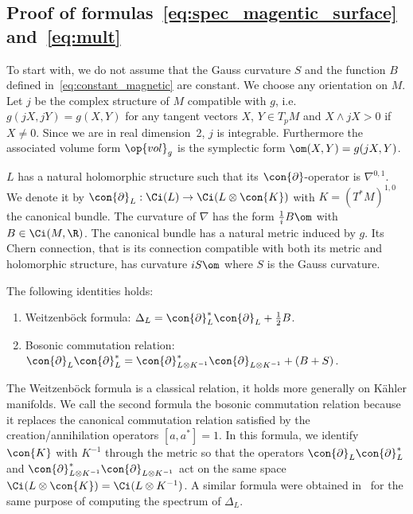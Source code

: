 \subsection*{Proof of formulas~\eqref{eq:spec_magentic_surface} and~\eqref{eq:mult}}

To start with, we do not assume that the Gauss curvature $S$ and the function $B$ defined in~\eqref{eq:constant_magnetic} are constant. We choose any orientation on $M$. Let $j$ be the complex structure of $M$ compatible with $g$, i.e. $g(jX, jY) = g(X,Y)$ for any tangent vectors $X$, $Y \in T_pM$ and $ X
\wedge jX >0$ if $X \neq 0$. Since we are in real dimension~2, $j$ is integrable. Furthermore the associated volume form $\op{vol}_g$ is the symplectic form $\om (X, Y) = g(jX, Y)$.

$L$ has a natural holomorphic structure such that its $\con{\partial}$-operator is $\nabla^{0,1}$. We denote it by $\con{\partial}_L: \Ci (L) \rightarrow \Ci (L \otimes \con{K})$ with $K = (T^*M)^{1,0}$ the canonical bundle. The curvature of $\nabla$ has the form $\frac{1}{i} B \om$ with $B \in \Ci (M, \R)$. The canonical bundle has a natural metric induced by $g$. Its Chern connection, that is its connection compatible with both its metric and holomorphic structure, has curvature $i S \om$ where $S$ is the Gauss curvature.

\begin{theo}\label{theo:appendix}
The following identities holds:
\begin{enumerate}
\item\label{theo7.1.1} Weitzenb\"ock formula: $\Delta_L = \con{\partial}^*_L \con{\partial}_L + \frac{1}{2} B$.
\item\label{theo7.1.2} Bosonic commutation relation: $ \con{\partial}_L \con{\partial}_L^* = \con{\partial}_{L\otimes K^{-1}} ^* \con{\partial}_{L\otimes K^{-1}} + (B + S)$.
\end{enumerate}
\end{theo}

The Weitzenb\"ock formula is a classical relation, it holds more generally on K\"ahler manifolds. We call the second formula the bosonic commutation relation because it replaces the canonical commutation relation satisfied by the creation/annihilation operators $[a, a^{*}] =1$. In this formula, we identify $\con{K}$ with $K^{-1}$ through the metric so that the operators $ \con{\partial}_L \con{\partial}_L^*$ and $\con{\partial}_{L\otimes K^{-1}} ^* \con{\partial}_{L\otimes K^{-1}}$ act on the same space $\Ci (L\otimes \con{K}) = \Ci (L
\otimes K^{-1})$. A similar formula were obtained in~\cite[Proposition~9]{Te06} for the same purpose of computing the spectrum of $\Delta_L$.


